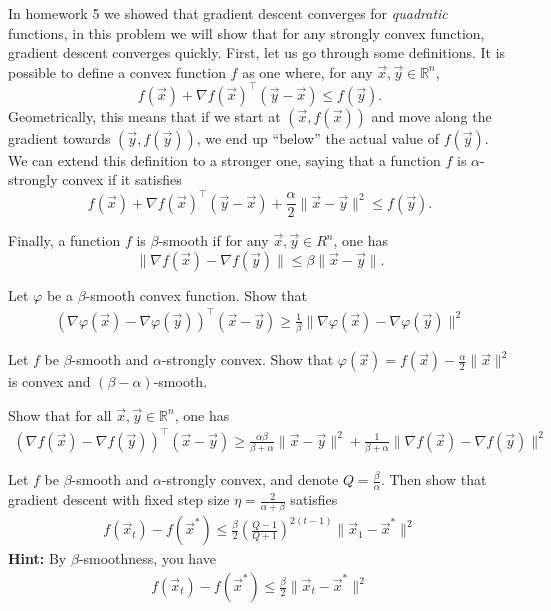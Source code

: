 \documentclass[preview]{standalone}
\begin{document}

In homework 5 we showed that gradient descent converges for \textit{quadratic} functions, in this problem we will show that for any strongly convex function, gradient descent converges quickly. 
First, let us go through some definitions. It is possible to define a convex function $f$ as one where, for any $\vec x, \vec y \in \mathbb{R}^n$,
$$f(\vec x) + \nabla f(\vec x)^\top (\vec y-\vec x) \leq f(\vec y).$$
Geometrically, this means that if we start at $(\vec x, f(\vec x))$ and move along the gradient towards $(\vec y, f(\vec y))$, we end up ``below'' the actual value of $f(\vec y)$. We can extend this definition to a stronger one, saying that a function $f$ is $\alpha$-strongly convex if it satisfies
$$f(\vec x) + \nabla f(\vec x)^\top (\vec y-\vec x) + \frac{\alpha}{2} \|\vec x-\vec y\|^2 \leq f(\vec y).$$

Finally, a function $f$ is $\beta$-smooth if for any $\vec x, \vec y \in R^n$, one has 
$$\| \nabla f(\vec x) - \nabla f(\vec y) \| \leq \beta \|\vec x - \vec y\|.$$

\begin{Parts}

\Part \label{pt:smooth}
Let $\varphi$ be a $\beta$-smooth convex function.
Show that
\begin{align*}
(\nabla \varphi(\vec x) - \nabla \varphi(\vec y))^\top  (\vec x-\vec y) \geq \frac{1}{\beta} \| \nabla \varphi(\vec x) - \nabla \varphi(\vec y) \|^2
\end{align*}




\Part Let $f$ be $\beta$-smooth and $\alpha$-strongly convex. Show that $\varphi(\vec x) = f(\vec x) - \frac{\alpha}{2} \| \vec x \|^2$ is convex and $(\beta-\alpha)$-smooth.





\Part \label{pt:inequality}
Show that for all $\vec x,\vec y \in \mathbb{R}^n$, one has
\begin{align*}
(\nabla f(\vec x) - \nabla f(\vec y))^\top  (\vec x-\vec y) \geq \frac{\alpha \beta}{\beta + \alpha} \| \vec x - \vec y \|^2 + \frac{1}{\beta + \alpha} \| \nabla f(\vec x) - \nabla f(\vec y)\|^2
\end{align*}


\Part Let $f$ be $\beta$-smooth and $\alpha$-strongly convex, and denote $Q = \frac{\beta}{\alpha}$. Then show that gradient descent with fixed step size $\eta = \frac{2}{\alpha + \beta}$ satisfies
\begin{align*}
f(\vec x_t) - f(\vec x^*) \leq \frac{\beta}{2} \left( \frac{Q-1}{Q+1} \right)^{2(t-1)}\|\vec x_1 - \vec x^*\|^2
\end{align*}
\textbf{Hint:} By $\beta$-smoothness, you have
\begin{align*}
f(\vec x_t)-f(\vec x^*) \leq \frac{\beta}{2} \|\vec x_t-\vec x^*\|^2
\end{align*}






\end{Parts}
\end{document}
